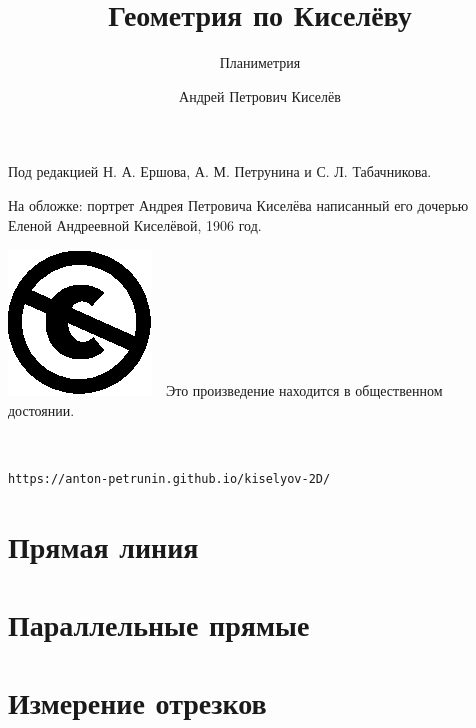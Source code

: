 \documentclass[twoside]{book}
\begin{document}
\cleardoublepage
\frontmatter
\title{Геометрия по Киселёву}
\subtitle{Планиметрия}
\author{Андрей Петрович Киселёв
}
\date{}
\maketitle

\thispagestyle{empty}

Под редакцией Н. А. Ершова, А. М. Петрунина и С. Л. Табачникова.

На обложке: портрет  Андрея Петровича Киселёва написанный его дочерью Еленой Андреевной Киселёвой, 1906 год.

\vfill

\noindent
\includegraphics[scale=.25]{eps/Cc-public_domain_mark_white}\ \ 
Это произведение находится в общественном достоянии.

\ 

\noindent\texttt{https://anton-petrunin.github.io/kiselyov-2D/} 

\mainmatter





\chapter{Прямая линия}





\chapter{Параллельные прямые}










\chapter{Измерение отрезков}


\end{document}
